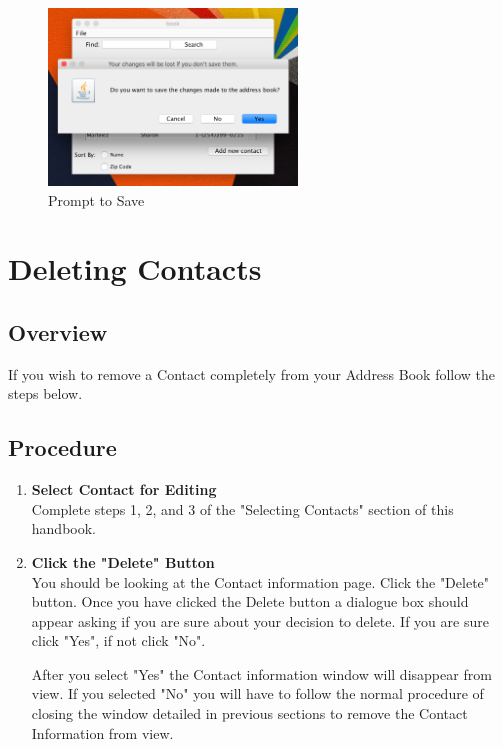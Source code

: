 \documentclass[a4paper, 11pt]{article}
\begin{document}
\begin{enumerate}[label=\textbf{\arabic*})]
    \begin{figure}[h!]
    \centering
      \includegraphics[width=250]{close_save_error.png}
      \caption{Prompt to Save}
    \end{figure}
\end{enumerate}

\clearpage

\section{Deleting Contacts}
\subsection{Overview}
If you wish to remove a Contact completely from your Address Book follow the steps below.
\subsection{Procedure}
\begin{enumerate}[label=\textbf{\arabic*})]
    \item{\textbf{Select Contact for Editing}}\\ Complete steps 1, 2, and 3 of the "Selecting Contacts" section of this handbook. 
    
    \item{\textbf{Click the "Delete" Button}}\\ You should be looking at the Contact information page. Click the "Delete" button. Once you have clicked the Delete button a dialogue box should appear asking if you are sure about your decision to delete. If you are sure click "Yes", if not click "No".
    
    After you select "Yes" the Contact information window will disappear from view. If you selected "No" you will have to follow the normal procedure of closing the window detailed in previous sections to remove the Contact Information from view.  
\end{enumerate}
\end{document}
